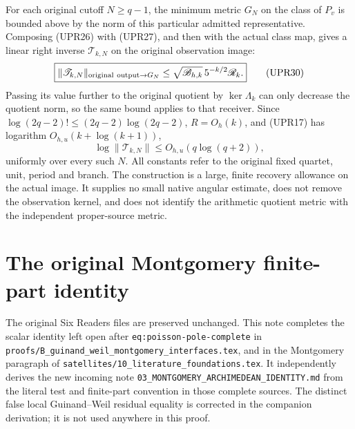 For each original cutoff \(N\ge q-1\), the minimum metric \(G_N\)
on the class of \(P_v\) is bounded above by the norm of this
particular admitted representative.  Composing (UPR26) with
(UPR27), and then with the actual class map, gives a linear
right inverse \(\mathscr T_{k,N}\) on the original observation image:
\[
\boxed{\displaystyle
\|\mathscr T_{k,N}\|_{{\rm original\ output}\to G_N}
\le \sqrt{\mathscr B_{h,k}}\,5^{-k/2}\mathscr R_k.}
\tag{UPR30}
\]
Passing its value further to the original quotient by
\(\ker\Lambda_k\) can only decrease the quotient norm, so the same
bound applies to that receiver.
Since \(\log(2q-2)!\le(2q-2)\log(2q-2)\), \(R=O_h(k)\),
and (UPR17) has logarithm \(O_{h,u}(k+\log(k+1))\),
\[
\log\|\mathscr T_{k,N}\|
\le O_{h,u}(q\log(q+2)),
\tag{UPR31}
\]
uniformly over every such \(N\).
All constants refer to the original fixed quartet, unit, period
and branch.  The construction is a large, finite recovery allowance
on the actual image.  It supplies no small native angular estimate,
does not remove the observation kernel, and does not identify the
arithmetic quotient metric with the independent proper-source metric.
\endgroup



\endgroup

\clearpage
\begingroup
\def\R{\mathbb R}
\def\C{\mathbb C}
\def\PF{\operatorname{PF}}
\def\dd{\,d}

\setcounter{equation}{0}
\renewcommand{\theequation}{A03MA.\arabic{equation}}
\section*{The original Montgomery finite-part identity}

\noindent The original Six Readers files are preserved unchanged. This note
completes the scalar identity left open after
\texttt{eq:poisson-pole-complete} in
\nolinkurl{proofs/B_guinand_weil_montgomery_interfaces.tex}, and in the
Montgomery paragraph of
\texttt{satellites/10\_literature\_foundations.tex}.
It independently derives the new incoming note
\texttt{03\_MONTGOMERY\_ARCHIMEDEAN\_IDENTITY.md} from the literal test and
finite-part convention in those complete sources. The distinct false local
Guinand--Weil residual equality is corrected in the companion derivation;
it is not used anywhere in this proof.

